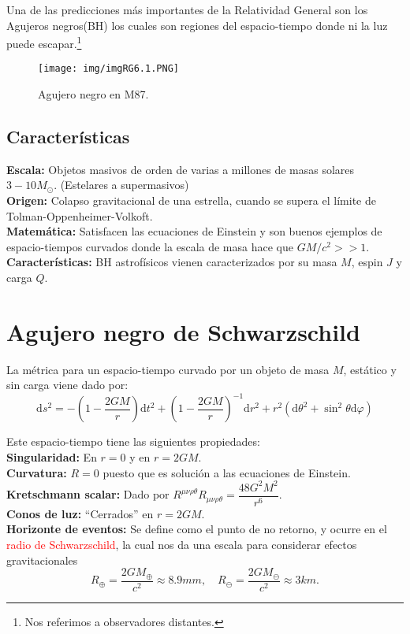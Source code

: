 \documentclass[../main]{subfiles}
\begin{document}
    Una de las predicciones más importantes de la Relatividad General son los Agujeros negros(BH) los cuales son regiones del espacio-tiempo donde ni la luz puede escapar.\footnote{Nos referimos a observadores distantes.}
\begin{figure}[h]
    \begin{center}
        \texttt{[image: img/imgRG6.1.PNG]}
        \caption{Agujero negro en M87.}
    \end{center}
\end{figure}

\subsection*{Características}
\textbf{Escala:} Objetos masivos de orden de varias a millones de masas solares $3-10 M_{\odot}$. (Estelares a supermasivos)\\
\textbf{Origen:} Colapso gravitacional de una estrella, cuando se supera el límite de Tolman-Oppenheimer-Volkoft.\\
\textbf{Matemática:} Satisfacen las ecuaciones de Einstein y son buenos ejemplos de espacio-tiempos curvados donde la escala de masa hace que $GM/c^2>>1$.\\
\textbf{Características:} BH astrofísicos vienen caracterizados por su masa $M$, espin $J$ y carga $Q$.

\section{Agujero negro de Schwarzschild}
La métrica para un espacio-tiempo curvado por un objeto de masa $M$, estático y sin carga viene dado por:
\begin{equation}
    \mathrm{d}s^2=-\left(1-\dfrac{2GM}{r}\right)\mathrm{d}t^2+\left(1-\dfrac{2GM}{r}\right)^{-1}\mathrm{d}r^2+r^2(\mathrm{d}\theta^2+\sin^2 \theta\mathrm{d}\varphi)
\end{equation}

Este espacio-tiempo tiene las siguientes propiedades:\\
\textbf{Singularidad:} En $r=0$ y en $r=2GM$.\\
\textbf{Curvatura:} $R=0$ puesto que es solución a las ecuaciones de Einstein.\\
\textbf{Kretschmann scalar:} Dado por $R^{\mu\nu\rho\theta}R_{\mu\nu\rho\theta}=\dfrac{48G^2M^2}{r^6}$.\\
\textbf{Conos de luz:} ``Cerrados'' en $r=2GM$.\\
\textbf{Horizonte de eventos:} Se define como el punto de no retorno, y ocurre en el \textcolor{red}{radio de Schwarzschild}, la cual nos da una escala para considerar efectos gravitacionales
\begin{equation}
    R_{\oplus}=\dfrac{2GM_{\oplus}}{c^2}\approx 8.9mm,\quad R_{\ominus}=\dfrac{2GM_{\ominus}}{c^2}\approx 3km.
\end{equation}
\end{document}
